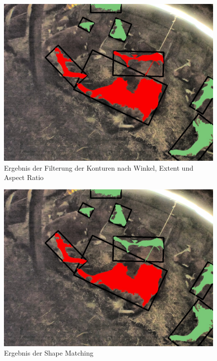 \begin{figure}[H]
	\center
	\includegraphics[scale=0.43]{Grafiken/entwicklung/30FilteredByExtentAspectAngle.jpg}
	\caption{Ergebnis der Filterung der Konturen nach Winkel, Extent und Aspect Ratio} 
	\label{fig: Ergebnis der Filterung der Konturen nach Extent und Aspect Ratio} 
\end{figure}

\begin{figure}[H]
	\center
	\includegraphics[scale=0.43]{Grafiken/entwicklung/31FilteredBySimilarity.jpg}
	\caption{Ergebnis der Shape Matching} 
	\label{fig: Ergebnis der Shape Matching} 
\end{figure}

